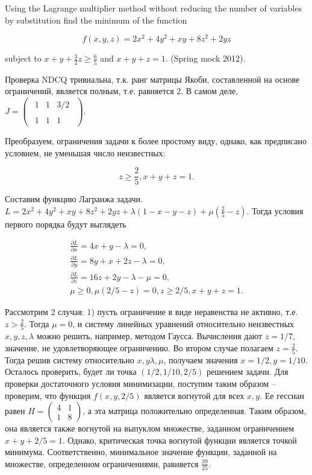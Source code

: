 \begin{problem}
Using the Lagrange multiplier method without reducing the number of variables by substitution find the minimum of the function

\[f(x,y,z)=2x^{2} +4y^{2} +xy+8z^{2} +2yz\] 

subject to $x+y+\frac{3}{2} z\ge \frac{6}{5} $ and $x+y+z=1$. (Spring mock 2012).
\end{problem}

\begin{solution}
Проверка NDCQ тривиальна, т.к. ранг матрицы Якоби, составленной на основе ограничений, является полным, т.е. равняется 2. В самом деле, $J=\left(\begin{array}{c} {\begin{array}{ccc} {1} & {1} & {3/2} \end{array}} \\ {\begin{array}{ccc} {1} & {1} & {1} \end{array}} \end{array}\right)$.

Преобразуем, ограничения задачи к более простому виду, однако, как предписано условием, не уменьшая число неизвестных:

\[z\ge \frac{2}{5} , x+y+z=1.\] 

Составим функцию Лагранжа задачи. $L=2x^{2} +4y^{2} +xy+8z^{2} +2yz+\lambda (1-x-y-z)+\mu (\frac{2}{5} -z)$. Тогда условия первого порядка будут выглядеть

\[\begin{array}{l} {\frac{\partial L}{\partial x} =4x+y-\lambda =0,} \\ {\frac{\partial L}{\partial y} =8y+x+2z-\lambda =0,} \\ {\frac{\partial L}{\partial z} =16z+2y-\lambda -\mu =0,} \\ {\mu \ge 0,  \mu (2/5-z)=0,  z\ge 2/5,  x+y+z=1.} \end{array}\] 

Рассмотрим 2 случая: 1) пусть ограничение в виде неравенства не активно, т.е.$z>\frac{2}{5} $. Тогда $\mu =0$, и систему линейных уравнений относительно неизвестных $x,y,z,\lambda $ можно решить, например, методом Гаусса. Вычисления дают $z=1/7$, значение, не удовлетворяющее ограничению. Во втором случае полагаем $z=\frac{2}{5} $. Тогда решив систему относительно $x,y\lambda ,\mu $, получаем значения  $x=1/2,  y=1/10$. Осталось проверить, будет ли точка $(1/2,1/10,2/5)$ решением задачи. Для проверки достаточного условия минимизации, поступим таким образом -- проверим, что функция $f(x,y,2/5)$ является вогнутой для всех $x,y$. Ее гессиан равен $H=\left(\begin{array}{cc} {4} & {1} \\ {1} & {8} \end{array}\right)$, а эта матрица положительно определенная. Таким образом, она является также вогнутой на выпуклом множестве, заданном ограничением $x+y+2/5=1$. Однако, критическая точка вогнутой функции является точкой минимума. Соответственно, минимальное значение функции, заданной на множестве, определенном ограничениями, равняется  $\frac{39}{25} $.
\end{solution}


